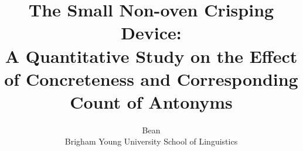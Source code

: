 \title{The Small Non-oven Crisping Device:\\
A Quantitative Study on the Effect of Concreteness and Corresponding Count of Antonyms}

\author{Bean\\
Brigham Young University School of Linguistics}
\renewcommand{\today}{April 24, 2013}
\maketitle
